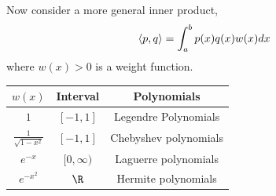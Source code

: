 \documentclass[../Main.tex]{subfiles}
\begin{document}
\begin{example}
    Now consider a more general inner product,
    \begin{equation*}
        \langle p,q\rangle = \int_{a}^{b} p(x) q(x) w(x) dx 
    \end{equation*}
    where $w(x) > 0$ is a weight function.

    \begin{tabular}{|c c c|}
        \hline
        $w(x)$ & Interval & Polynomials \\
        \hline
        $1$ & $[-1, 1]$ & Legendre Polynomials \\
        $\frac{1}{\sqrt{1 - x^2}}$ & $[-1, 1]$ & Chebyshev polynomials \\
        $e^{-x}$ & $[0, \infty)$ & Laguerre polynomials \\
        $e^{-x^2}$ & $\R$ & Hermite polynomials \\
        \hline
    \end{tabular}
\end{example}
\end{document}
